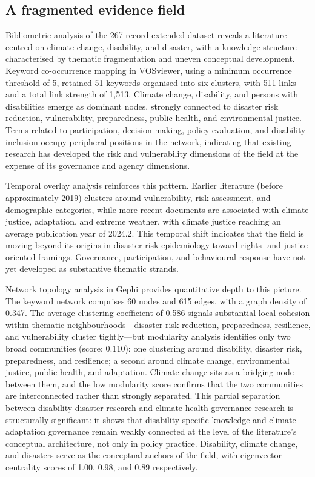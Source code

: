 \documentclass[12pt,a4paper]{article}
\begin{document}
\subsection*{A fragmented evidence field}

Bibliometric analysis of the 267-record extended dataset reveals a literature centred on climate change, disability, and disaster, with a knowledge structure characterised by thematic fragmentation and uneven conceptual development. Keyword co-occurrence mapping in VOSviewer, using a minimum occurrence threshold of 5, retained 51 keywords organised into six clusters, with 511 links and a total link strength of 1,513. Climate change, disability, and persons with disabilities emerge as dominant nodes, strongly connected to disaster risk reduction, vulnerability, preparedness, public health, and environmental justice. Terms related to participation, decision-making, policy evaluation, and disability inclusion occupy peripheral positions in the network, indicating that existing research has developed the risk and vulnerability dimensions of the field at the expense of its governance and agency dimensions.

Temporal overlay analysis reinforces this pattern. Earlier literature (before approximately 2019) clusters around vulnerability, risk assessment, and demographic categories, while more recent documents are associated with climate justice, adaptation, and extreme weather, with climate justice reaching an average publication year of 2024.2. This temporal shift indicates that the field is moving beyond its origins in disaster-risk epidemiology toward rights- and justice-oriented framings. Governance, participation, and behavioural response have not yet developed as substantive thematic strands.

Network topology analysis in Gephi provides quantitative depth to this picture. The keyword network comprises 60 nodes and 615 edges, with a graph density of 0.347. The average clustering coefficient of 0.586 signals substantial local cohesion within thematic neighbourhoods---disaster risk reduction, preparedness, resilience, and vulnerability cluster tightly---but modularity analysis identifies only two broad communities (score: 0.110): one clustering around disability, disaster risk, preparedness, and resilience; a second around climate change, environmental justice, public health, and adaptation. Climate change sits as a bridging node between them, and the low modularity score confirms that the two communities are interconnected rather than strongly separated. This partial separation between disability-disaster research and climate-health-governance research is structurally significant: it shows that disability-specific knowledge and climate adaptation governance remain weakly connected at the level of the literature's conceptual architecture, not only in policy practice. Disability, climate change, and disasters serve as the conceptual anchors of the field, with eigenvector centrality scores of 1.00, 0.98, and 0.89 respectively.
\end{document}
